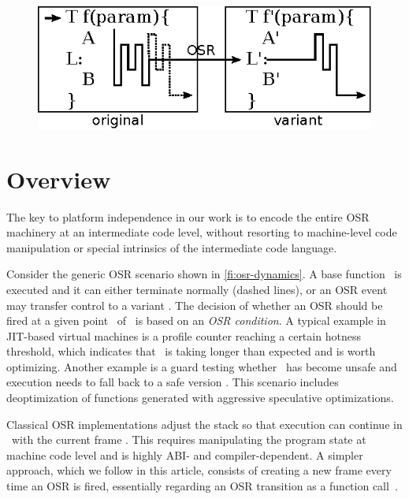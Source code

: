 
\ifdefined\noauthorea
\begin{figure}[t]
\begin{center}
\includegraphics[width=0.6\columnwidth]{figures/overview-osr/overview-osr.eps}
\caption{\protect}
\end{center}
\end{figure}
\fi

\section{Overview}
\label{se:overview}

The key to platform independence in our work is to encode the entire OSR machinery at an intermediate code level, without resorting to machine-level code manipulation or special intrinsics of the intermediate code language. %


Consider the generic OSR scenario shown in \myfigure\ref{fi:osr-dynamics}. A base function \fbase\ is executed and it can either terminate normally (dashed lines), or an OSR event may transfer control to a variant \fvariant. The decision of whether an OSR should be fired at a given point \osrpoint\ of \fbase\ is based on an {\em OSR condition}. A typical example in JIT-based virtual machines is a profile counter reaching a certain hotness threshold, which indicates that \fbase\ is taking longer than expected and is worth optimizing. Another example is a guard testing whether \fbase\ has become unsafe and execution needs to fall back to a safe version \fvariant. This scenario includes deoptimization of functions generated with aggressive speculative optimizations. 

Classical OSR implementations adjust the stack so that execution can continue in \fvariant\ with the current frame \cite{chambers1992design}. This requires manipulating the program state at machine code level and is highly ABI- and compiler-dependent. A simpler approach, which we follow in this article, consists of creating a new frame every time an OSR is fired, essentially regarding an OSR transition as a function call~\cite{Lameed_2013,webkit14}. 

